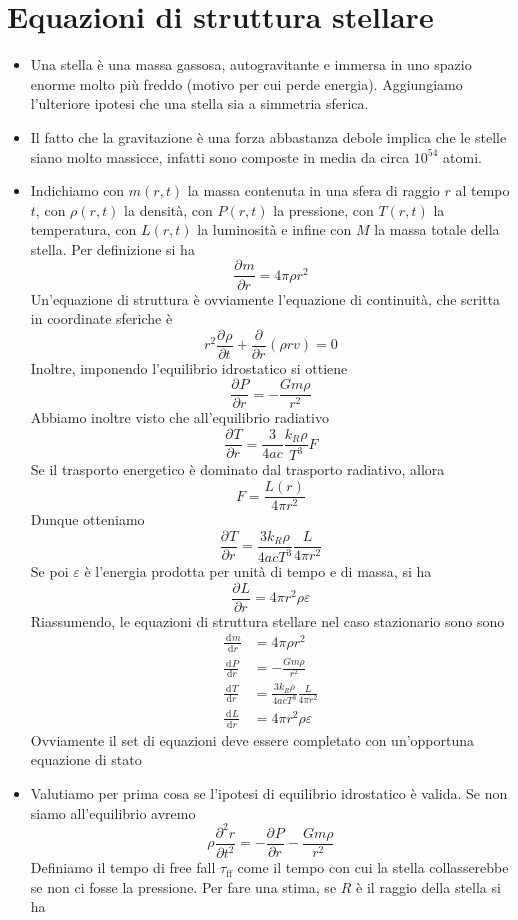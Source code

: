 \documentclass[a4paper,11pt]{article}
\renewcommand{\d}{\mathrm{d}} %
\newcommand{\der}[3][]{\frac{\d ^{#1}#2}{\d {#3}^{#1}}} %
\newcommand{\pder}[3][]{\frac{\partial ^{#1}#2}{\partial {#3}^{#1}}} %
\renewcommand{\d}{\,\mathrm{d}}
\theoremstyle{theorem}
\theoremstyle{definition}
\begin{document}
	\section{Equazioni di struttura stellare}
	\begin{itemize}
		\item Una stella è una massa gassosa, autogravitante e immersa in uno spazio enorme molto più freddo (motivo per cui perde energia). Aggiungiamo l'ulteriore ipotesi che una stella sia a simmetria sferica.
		\item Il fatto che la gravitazione è una forza abbastanza debole implica che le stelle siano molto massicce, infatti sono composte in media da circa $10^{54}$ atomi.
		\item Indichiamo con $m(r,t)$ la massa contenuta in una sfera di raggio $r$ al tempo $t$, con $\rho(r,t)$ la densità, con $P(r,t)$ la pressione, con $T(r,t)$ la temperatura, con $L(r,t)$ la luminosità e infine con $M$ la massa totale della stella. Per definizione si ha
		\[\pder{m}{r}=4\pi \rho r^2\] Un'equazione di struttura è ovviamente l'equazione di continuità, che scritta in coordinate sferiche è
		\[r^2\pder{\rho}{t}+\pder{}{r}\left(\rho r v\right)=0\]
		Inoltre, imponendo l'equilibrio idrostatico si ottiene
		\[\pder{P}{r}=-\frac{Gm\rho}{r^2}\]
		Abbiamo inoltre visto che all'equilibrio radiativo
		\[\pder{T}{r}=\frac{3}{4ac}\frac{k_R\rho}{T^3}F\]
		Se il trasporto energetico è dominato dal trasporto radiativo, allora
		\[F=\frac{L(r)}{4\pi r^2}\]
		Dunque otteniamo
		\[\pder{T}{r}=\frac{3k_R\rho}{4acT^3}\frac{L}{4\pi r^2}\]
		Se poi $\varepsilon$ è l'energia prodotta per unità di tempo e di massa, si ha
		\[\pder{L}{r}=4\pi r^2\rho\varepsilon\]
		Riassumendo, le equazioni di struttura stellare nel caso stazionario sono sono
		\begin{align*}
			\der{m}{r}&=4\pi \rho r^2\\
			\der{P}{r}&=-\frac{Gm\rho}{r^2}\\
			\der{T}{r}&=\frac{3k_R\rho}{4acT^3}\frac{L}{4\pi r^2}\\
			\der{L}{r}&=4\pi r^2\rho\varepsilon
		\end{align*}
		Ovviamente il set di equazioni deve essere completato con un'opportuna equazione di stato
		\item Valutiamo per prima cosa se l'ipotesi di equilibrio idrostatico è valida.
		Se non siamo all'equilibrio avremo
		\[\rho\pder[2]{r}{t}=-\pder{P}{r}-\frac{Gm\rho}{r^2}\] 
		Definiamo il tempo di free fall $\tau_{\textrm{ff}}$ come il tempo con cui la stella collasserebbe se non ci fosse la pressione. Per fare una stima, se $R$ è il raggio della stella si ha

\end{itemize}
\end{document}
